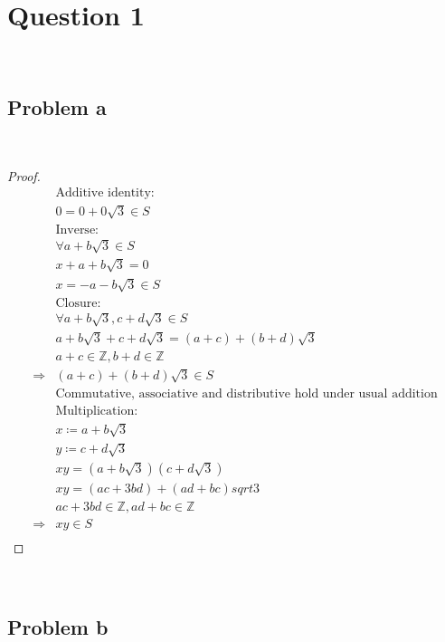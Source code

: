 \documentclass{article}
\begin{document}
\section*{Question 1}

~

\subsection*{Problem a}

~

\begin{proof}
    \begin{align*}
        &\text{Additive identity}:\\
        &0=0+0\sqrt{3}\in S\\
        &\text{Inverse}:\\
        &\forall a+b\sqrt{3}\in S\\
        &x+a+b\sqrt{3}=0\\
        &x=-a-b\sqrt{3}\in S\\
        &\text{Closure}:\\
        &\forall a+b\sqrt{3},c+d\sqrt{3}\in S\\
        &a+b\sqrt{3}+c+d\sqrt{3}=(a+c)+(b+d)\sqrt{3}\\
        &a+c\in\mathbb{Z} ,b+d\in\mathbb{Z} \\
        \Rightarrow&(a+c)+(b+d)\sqrt{3}\in S\\
        &\text{Commutative, associative and distributive hold under usual addition}\\
        &\text{Multiplication}:\\
        &x\coloneqq a+b\sqrt{3}\\
        &y\coloneqq c+d\sqrt{3}\\
        &xy=(a+b\sqrt{3})(c+d\sqrt{3})\\
        &xy=(ac+3bd)+(ad+bc)sqrt{3}\\
        &ac+3bd\in\mathbb{Z} ,ad+bc\in\mathbb{Z} \\
        \Rightarrow&xy\in S\\
    \end{align*}
\end{proof}

~

\subsection*{Problem b}

~
\end{document}
